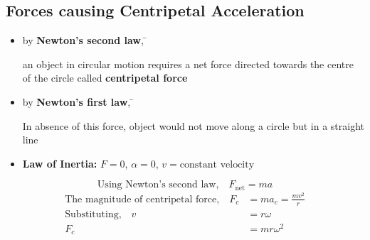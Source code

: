 \subsection{Forces causing Centripetal Acceleration}
\begin{itemize}
	\item
		\begin{tabbing}
			by \textbf{Newton's second law}, \=
			\parbox[t]{0.65\textwidth}{%
				an object in circular motion requires
				a net force directed towards the centre of the circle called \textbf{centripetal force}}
		\end{tabbing}
	\item
	 \begin{tabbing}
		 by \textbf{Newton's first law}, \=
			\parbox[t]{0.67\textwidth}{%
				In absence of this force, object would not move along a circle but in a straight line}
	 \end{tabbing}
	\item \textbf{Law of Inertia:} $F=0$, $\alpha=0$, $v=\text{constant velocity}$
\end{itemize}
\begin{equation}
	\text{Using Newton's second law,}\quad
	F_\text{net} = ma
\end{equation}
\begin{align}
	\text{The magnitude of centripetal force,}\quad
	F_c &= ma_c = \frac{mv^2}{r} \\
	\text{Substituting,}\quad
	v &= r\omega \\
	F_c &= mr\omega^2
\end{align}


